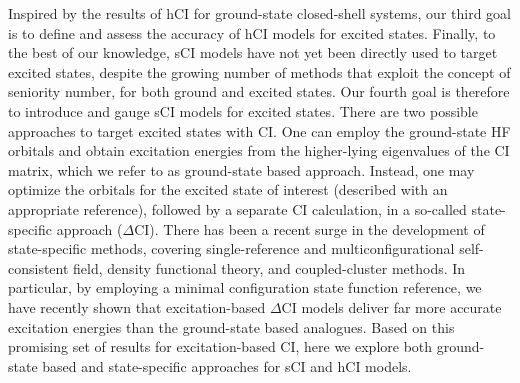 \documentclass[aip,jcp,reprint,noshowkeys,superscriptaddress]{revtex4-1}
\begin{document}
Inspired by the results of hCI for ground-state closed-shell systems, \cite{Kossoski_2022} our third goal is to define and assess the accuracy of hCI models for excited states.
Finally, to the best of our knowledge, sCI models have not yet been directly used to target excited states,
despite the growing number of methods that exploit the concept of seniority number,
for both ground
\cite{Limacher_2013,Limacher_2014,Tecmer_2014,Boguslawski_2014a,Boguslawski_2015,Boguslawski_2014b,Boguslawski_2014c,Johnson_2020,Henderson_2014,Stein_2014,Henderson_2015,Chen_2015,Bytautas_2018,Marie_2021,Boguslawski_2021,Tecmer_2022,Mamache_2023} 
and excited states.
\cite{Boguslawski_2016b,Boguslawski_2016c,Boguslawski_2019,Nowak_2019,Kossoski_2021,Marie_2021,Tecmer_2022,Rishi_2023,Nowak_2023} 
Our fourth goal is therefore to introduce and gauge sCI models for excited states.
There are two possible approaches to target excited states with CI.
One can employ the ground-state HF orbitals and obtain excitation energies from the higher-lying eigenvalues of the CI matrix, which we refer to as ground-state based approach.
Instead, one may optimize the orbitals for the excited state of interest (described with an appropriate reference), followed by a separate CI calculation,
in a so-called state-specific approach ($\Delta$CI).
There has been a recent surge in the development of state-specific methods, covering 
single-reference and multiconfigurational self-consistent field,
\cite{Ziegler_1977,Burton_2021,Shea_2018,Tran_2019,Tran_2020,Hardikar_2020,Burton_2022,Hanscam_2022,Kossoski_2023,Marie_2023}
density functional theory, 
\cite{Filatov_1999,Kowalczyk_2011,Kowalczyk_2013,Gilbert_2008,Barca_2018,Hait_2020,Hait_2021,Hardikar_2020,Zhao_2020,Levi_2020,Carter-Fenk_2020,Toffoli_2022,Schmerwitz_2022}
and coupled-cluster 
\cite{Piecuch_2000,Mayhall_2010,Lee_2019,Kossoski_2021,Marie_2021,Rishi_2023}
methods.
In particular, by employing a minimal configuration state function reference, 
we have recently shown that excitation-based $\Delta$CI models deliver far more accurate excitation energies than the ground-state based analogues. \cite{Kossoski_2023}
Based on this promising set of results for excitation-based CI, here we explore both ground-state based and state-specific approaches for sCI and hCI models.
\end{document}
